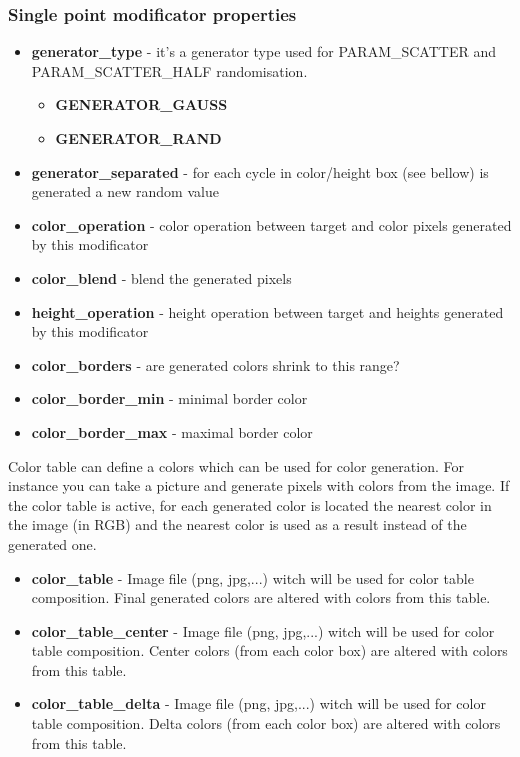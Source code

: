 \documentclass[9pt]{article}
\begin{document}
\subsubsection*{Single point modificator properties}
\begin{itemize}
\item{\bf generator\_type} - it's a generator type used for PARAM\_SCATTER 
and PARAM\_SCATTER\_HALF randomisation.
\begin{itemize}
\item{\bf GENERATOR\_GAUSS}
\item{\bf GENERATOR\_RAND}
\end{itemize}
\item{\bf generator\_separated} - for each cycle in color/height box (see bellow) is
generated a new random value
\item{\bf color\_operation} - color operation between target and color pixels 
generated by this modificator
\item{\bf color\_blend} - blend the generated pixels
\item{\bf height\_operation} - height operation between target and heights
generated by this modificator
\item{\bf color\_borders} - are generated colors shrink to this range?
\item{\bf color\_border\_min} - minimal border color
\item{\bf color\_border\_max} - maximal border color
\end{itemize}
Color table can define a colors which can be used for color generation. 
For instance you can take a picture and generate pixels with colors from
the image. If the color table is active, for each generated
color is located the nearest color in the image (in RGB) and the nearest 
color is used as a result instead of the generated one.
\begin{itemize}
\item{\bf color\_table} - Image file (png, jpg,...) witch will be used for 
color table composition. Final generated colors are altered with colors from this table.
\item{\bf color\_table\_center} - Image file (png, jpg,...) witch will be used 
for color table composition. Center colors (from each color box) are altered 
with colors from this table.
\item{\bf color\_table\_delta} - Image file (png, jpg,...) witch will be used 
for color table composition. Delta colors (from each color box) are altered 
with colors from this table.
\end{itemize}
\end{document}
